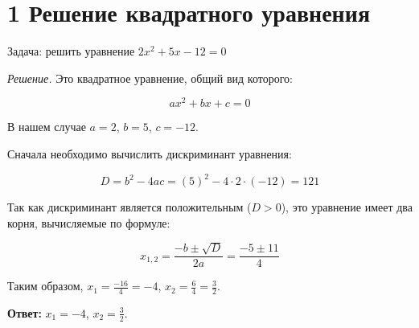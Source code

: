 \documentclass[12pt]{article}
\begin{document}
\section*{1 Решение квадратного уравнения}

Задача: решить уравнение \(2x^2 + 5x - 12 = 0\)

\textit{Решение.} Это квадратное уравнение, общий вид которого:

\[ ax^2 + bx + c = 0 \]

В нашем случае \(a = 2\), \(b = 5\), \(c = -12\).

Сначала необходимо вычислить дискриминант уравнения:

\[ D = b^2 - 4ac = (5)^2 - 4 \cdot 2 \cdot (-12) = 121 \]

Так как дискриминант является положительным (\(D > 0\)), это уравнение имеет два корня, вычисляемые по формуле:

\[ x_{1,2} = \frac{-b \pm \sqrt{D}}{2a} = \frac{-5 \pm 11}{4} \]

Таким образом, \(x_1 = \frac{-16}{4} = -4\), \(x_2 = \frac{6}{4} = \frac{3}{2}\).

\textbf{Ответ:} \(x_1 = -4\), \(x_2 = \frac{3}{2}\).
\end{document}
